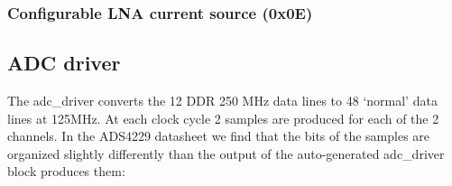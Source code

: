 \documentclass[a4paper,indent]{paper}
\begin{document}
\subsubsection{Configurable LNA current source (0x0E)}




\subsection{\acs{ADC} driver}
The adc\_driver converts the 12 \ac{DDR} 250 MHz data lines to 48 `normal' data lines at 125MHz.
At each clock cycle 2 samples are produced for each of the 2 channels.
In the ADS4229 datasheet we find that the bits of the samples are organized slightly differently than the output of the auto-generated adc\_driver block produces them:
\end{document}
